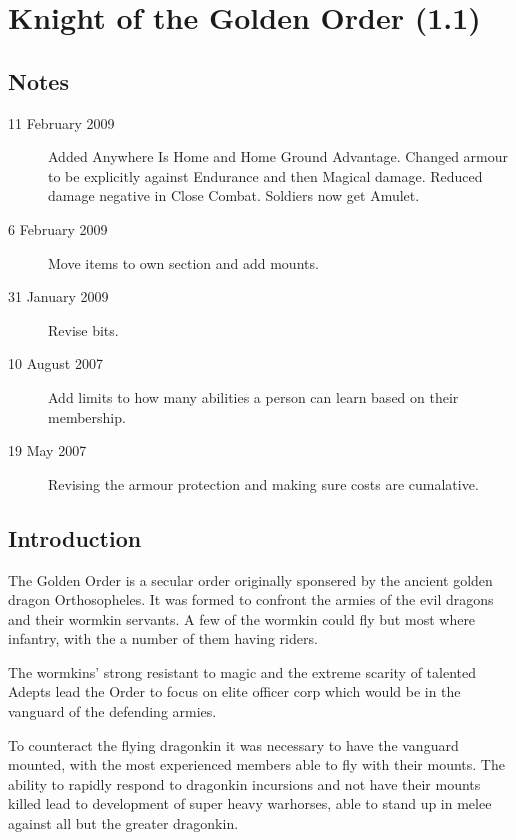 \documentclass[a4paper]{article}
\begin{document}
\section*{Knight of the Golden Order (1.1)}

\begin{multicols*}{3}

\subsection*{Notes}

\begin{description}
\item[11 February 2009] Added Anywhere Is Home and Home Ground
  Advantage.  Changed armour to be explicitly against Endurance and
  then Magical damage.  Reduced damage negative in Close Combat.
  Soldiers now get Amulet.

\item[6 February 2009] Move items to own section and add mounts.

\item[31 January 2009] Revise bits.

\item[10 August 2007] Add limits to how many abilities a person can
  learn based on their membership.

\item[19 May 2007] Revising the armour protection and making sure
  costs are cumalative.
\end{description}

\subsection*{Introduction}

The Golden Order is a secular order originally sponsered by the
ancient golden dragon Orthosopheles.  It was formed to confront the
armies of the evil dragons and their wormkin servants.  A few of the
wormkin could fly but most where infantry, with the a number of them
having riders.

The wormkins' strong resistant to magic and the extreme scarity of
talented Adepts lead the Order to focus on elite officer corp which
would be in the vanguard of the defending armies.

To counteract the flying dragonkin it was necessary to have the
vanguard mounted, with the most experienced members able to fly with
their mounts.  The ability to rapidly respond to dragonkin incursions
and not have their mounts killed lead to development of super heavy
warhorses, able to stand up in melee against all but the greater
dragonkin.


\end{multicols*}
\end{document}
